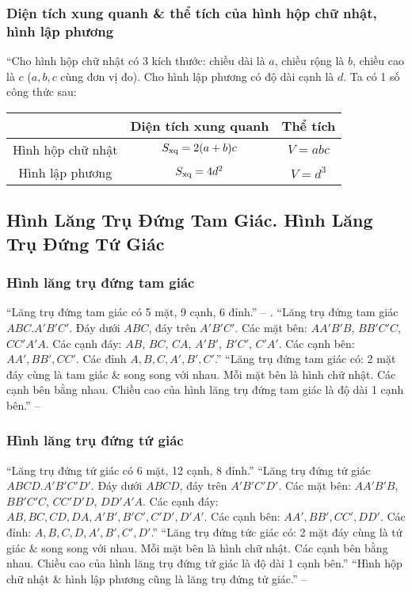 \documentclass{article}
\numberwithin{equation}{section}
\begin{document}
\subsubsection{Diện tích xung quanh \& thể tích của hình hộp chữ nhật, hình lập phương}
``Cho hình hộp chữ nhật có 3 kích thước: chiều dài là $a$, chiều rộng là $b$, chiều cao là $c$ ($a,b,c$ cùng đơn vị đo). Cho hình lập phương có độ dài cạnh là $d$. Ta có 1 số công thức sau:
\begin{table}[H]
	\centering
	\begin{tabular}{|c|c|c|}
		\hline
		& \textbf{Diện tích xung quanh} & \textbf{Thể tích} \\
		\hline
		Hình hộp chữ nhật & $S_{\rm xq} = 2(a + b)c$ & $V = abc$ \\
		\hline
		Hình lập phương & $S_{\rm xq} = 4d^2$ & $V = d^3$ \\
		\hline
	\end{tabular}
\end{table}

\subsection{Hình Lăng Trụ Đứng Tam Giác. Hình Lăng Trụ Đứng Tứ Giác}

\subsubsection{Hình lăng trụ đứng tam giác}
``Lăng trụ đứng tam giác có 5 mặt, 9 cạnh, 6 đỉnh.'' -- \cite[p. 81]{SGK_Toan_7_Canh_Dieu_tap_1}. ``Lăng trụ đứng tam giác $ABC.A'B'C'$. Đáy dưới $ABC$, đáy trên $A'B'C'$. Các mặt bên: $AA'B'B$, $BB'C'C$, $CC'A'A$. Các cạnh đáy: $AB$, $BC$, $CA$, $A'B'$, $B'C'$, $C'A'$. Các cạnh bên: $AA',BB',CC'$. Các đỉnh $A,B,C,A',B',C'$.'' ``Lăng trụ đứng tam giác có: 2 mặt đáy cùng là tam giác \& song song với nhau. Mỗi mặt bên là hình chữ nhật. Các cạnh bên bằng nhau. Chiều cao của hình lăng trụ đứng tam giác là độ dài 1 cạnh bên.'' -- \cite[p. 82]{SGK_Toan_7_Canh_Dieu_tap_1}

\subsubsection{Hình lăng trụ đứng tứ giác}
``Lăng trụ đứng tứ giác có 6 mặt, 12 cạnh, 8 đỉnh.'' ``Lăng trụ đứng tứ giác $ABCD.A'B'C'D'$. Đáy dưới $ABCD$, đáy trên $A'B'C'D'$. Các mặt bên: $AA'B'B$, $BB'C'C$, $CC'D'D$, $DD'A'A$. Các cạnh đáy: $AB,BC,CD,DA,A'B',B'C',C'D',D'A'$. Các cạnh bên: $AA',BB',CC',DD'$. Các đỉnh: $A,B,C,D,A',B',C',D'$.'' ``Lăng trụ đứng tức giác có: 2 mặt đáy cùng là tứ giác \& song song với nhau. Mỗi mặt bên là hình chữ nhật. Các cạnh bên bằng nhau. Chiều cao của hình lăng trụ đứng tứ giác là độ dài 1 cạnh bên.'' ``Hình hộp chữ nhật \& hình lập phương cũng là lăng trụ đứng tứ giác.'' -- \cite[p. 83]{SGK_Toan_7_Canh_Dieu_tap_1}
\end{document}
